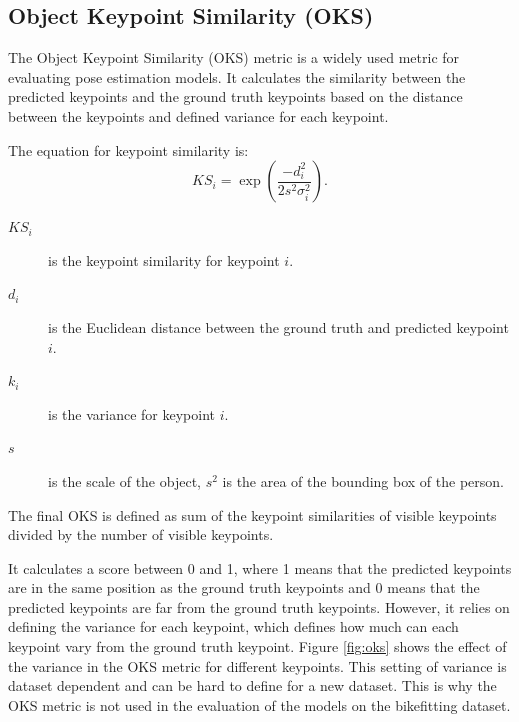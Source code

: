 \subsection{Object Keypoint Similarity (OKS)}
The Object Keypoint Similarity (OKS) metric is a widely used metric for evaluating pose estimation models. It calculates the similarity between the predicted keypoints and the ground truth keypoints based on the distance between the keypoints and defined variance for each keypoint.

The equation for keypoint similarity is:
$$KS_i = \exp\left(\frac{-d^2_i}{2s^2\sigma^2_i}\right). $$

\begin{description}
    \item[$KS_i$] is the keypoint similarity for keypoint $i$.
    \item[$d_i$] is the Euclidean distance between the ground truth and predicted keypoint $i$.
    \item[$k_i$] is the variance for keypoint $i$.
    \item[$s$] is the scale of the object, $s^2$ is the area of the bounding box of the person.
\end{description}

The final OKS is defined as sum of the keypoint similarities of visible keypoints divided by the number of visible keypoints.

It calculates a score between 0 and 1, where 1 means that the predicted keypoints are in the same position as the ground truth keypoints and 0 means that the predicted keypoints are far from the ground truth keypoints. However, it relies on defining the variance for each keypoint, which defines how much can each keypoint vary from the ground truth keypoint. Figure \ref{fig:oks} shows the effect of the variance in the OKS metric for different keypoints. This setting of variance is dataset dependent and can be hard to define for a new dataset. This is why the OKS metric is not used in the evaluation of the models on the bikefitting dataset.


